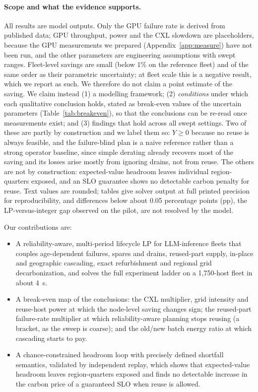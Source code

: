 \documentclass{article} %
\begin{document}
\paragraph{Scope and what the evidence supports.} All results are model outputs. Only the GPU failure rate is derived from published data; GPU throughput, power and the CXL slowdown are placeholders, because the GPU measurements we prepared (Appendix~\ref{app:measure}) have not been run, and the other parameters are engineering assumptions with swept ranges. Fleet-level savings are small (below 1\% on the reference fleet) and of the same order as their parametric uncertainty; at fleet scale this is a negative result, which we report as such. We therefore do not claim a point estimate of the saving. We claim instead (1) a modelling framework; (2) \emph{conditions} under which each qualitative conclusion holds, stated as break-even values of the uncertain parameters (Table~\ref{tab:breakeven}), so that the conclusions can be re-read once measurements exist; and (3) findings that hold across all swept settings. Two of these are partly by construction and we label them so: $Y\ge 0$ because no reuse is always feasible, and the failure-blind plan is a naive reference rather than a strong operator baseline, since simple derating already recovers most of the saving and its losses arise mostly from ignoring drains, not from reuse. The others are not by construction: expected-value headroom leaves individual region-quarters exposed, and an SLO guarantee shows no detectable carbon penalty for reuse. Text values are rounded; tables give solver output at full printed precision for reproducibility, and differences below about 0.05 percentage points (pp), the LP-versus-integer gap observed on the pilot, are not resolved by the model.

Our contributions are:
\begin{itemize}
    \item A reliability-aware, multi-period lifecycle LP for LLM-inference fleets that couples age-dependent failures, spares and drains, reused-part supply, in-place and geographic cascading, exact refurbishment and regional grid decarbonization, and solves the full experiment ladder on a 1,750-host fleet in about 4~s.
    \item A break-even map of the conclusions: the CXL multiplier, grid intensity and reuse-host power at which the node-level saving changes sign; the reused-part failure-rate multiplier at which reliability-aware planning stops reusing (a bracket, as the sweep is coarse); and the old/new batch energy ratio at which cascading starts to pay.
    \item A chance-constrained headroom loop with precisely defined shortfall semantics, validated by independent replay, which shows that expected-value headroom leaves region-quarters exposed and finds no detectable increase in the carbon price of a guaranteed SLO when reuse is allowed.
\end{itemize}
\end{document}
